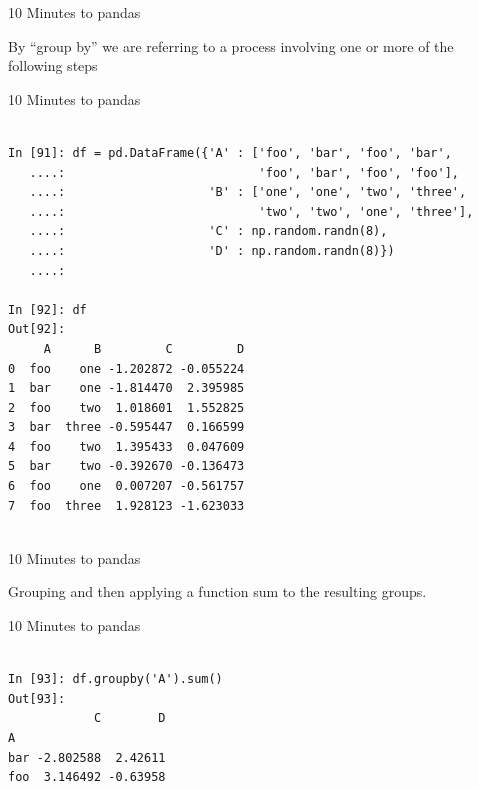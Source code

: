 \documentclass{beamer}
\begin{document}
\begin{frame}[t]{10 Minutes to pandas}

By “group by” we are referring to a process involving one or more of the
following steps

\end{frame}




\begin{frame}[t,fragile]{10 Minutes to pandas}


	\scriptsize
\begin{verbatim}

In [91]: df = pd.DataFrame({'A' : ['foo', 'bar', 'foo', 'bar',
   ....:                           'foo', 'bar', 'foo', 'foo'],
   ....:                    'B' : ['one', 'one', 'two', 'three',
   ....:                           'two', 'two', 'one', 'three'],
   ....:                    'C' : np.random.randn(8),
   ....:                    'D' : np.random.randn(8)})
   ....: 

In [92]: df
Out[92]: 
     A      B         C         D
0  foo    one -1.202872 -0.055224
1  bar    one -1.814470  2.395985
2  foo    two  1.018601  1.552825
3  bar  three -0.595447  0.166599
4  foo    two  1.395433  0.047609
5  bar    two -0.392670 -0.136473
6  foo    one  0.007207 -0.561757
7  foo  three  1.928123 -1.623033


\end{verbatim}


\end{frame}


\begin{frame}[t]{10 Minutes to pandas}

Grouping and then applying a function sum to the resulting groups.

\end{frame}


\begin{frame}[t,fragile]{10 Minutes to pandas}


	\scriptsize
\begin{verbatim}

In [93]: df.groupby('A').sum()
Out[93]: 
            C        D
A                     
bar -2.802588  2.42611
foo  3.146492 -0.63958


\end{verbatim}


\end{frame}
\end{document}

